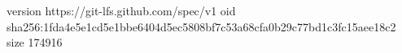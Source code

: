 version https://git-lfs.github.com/spec/v1
oid sha256:1fda4e5e1cd5e1bbe6404d5ec5808bf7c53a68cfa0b29c77bd1c3fc15aee18c2
size 174916
